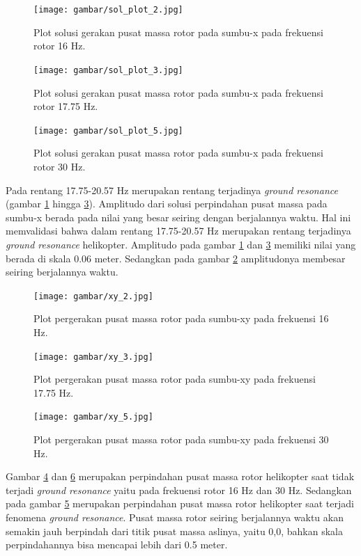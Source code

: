\begin{figure}[H]
	\centering
	\texttt{[image: gambar/sol\_plot\_2.jpg]}
	\caption{Plot solusi gerakan pusat massa rotor pada sumbu-x pada frekuensi rotor 16 Hz.}
	\label{fig:sol_plot_2}
\end{figure}

\begin{figure}[H]
	\centering
	\texttt{[image: gambar/sol\_plot\_3.jpg]}
	\caption{Plot solusi gerakan pusat massa rotor pada sumbu-x pada frekuensi rotor 17.75 Hz.}
	\label{fig:sol_plot_3}
\end{figure}

\begin{figure}[H]
	\centering
	\texttt{[image: gambar/sol\_plot\_5.jpg]}
	\caption{Plot solusi gerakan pusat massa rotor pada sumbu-x pada frekuensi rotor 30 Hz.}
	\label{fig:sol_plot_5}
\end{figure}

Pada rentang 17.75-20.57 Hz merupakan rentang terjadinya \textit{ground resonance} (gambar \ref{fig:sol_plot_2} hingga \ref{fig:sol_plot_5}). Amplitudo dari solusi perpindahan pusat massa pada sumbu-x berada pada nilai yang besar seiring dengan berjalannya waktu. Hal ini memvalidasi bahwa dalam rentang 17.75-20.57 Hz merupakan rentang terjadinya \textit{ground resonance} helikopter. Amplitudo pada gambar \ref{fig:sol_plot_2} dan \ref{fig:sol_plot_5} memiliki nilai yang berada di skala 0.06 meter. Sedangkan pada gambar \ref{fig:sol_plot_3} amplitudonya membesar seiring berjalannya waktu. 

\begin{figure}[H]
	\centering
	\texttt{[image: gambar/xy\_2.jpg]}
	\caption{Plot pergerakan pusat massa rotor pada sumbu-xy pada frekuensi 16 Hz.}
	\label{fig:xy_2}
\end{figure}

\begin{figure}[H]
	\centering
	\texttt{[image: gambar/xy\_3.jpg]}
	\caption{Plot pergerakan pusat massa rotor pada sumbu-xy pada frekuensi 17.75 Hz.}
	\label{fig:xy_3}
\end{figure}

\begin{figure}[H]
	\centering
	\texttt{[image: gambar/xy\_5.jpg]}
	\caption{Plot pergerakan pusat massa rotor pada sumbu-xy pada frekuensi 30 Hz.}
	\label{fig:xy_5}
\end{figure}

Gambar \ref{fig:xy_2} dan \ref{fig:xy_5} merupakan perpindahan pusat massa rotor helikopter saat tidak terjadi \textit{ground resonance} yaitu pada frekuensi rotor 16 Hz dan 30 Hz. Sedangkan pada gambar \ref{fig:xy_3} merupakan perpindahan pusat massa rotor helikopter saat terjadi fenomena \textit{ground resonance}. Pusat massa rotor seiring berjalannya waktu akan semakin jauh berpindah dari titik pusat massa aslinya, yaitu 0,0, bahkan skala perpindahannya bisa mencapai lebih dari 0.5 meter. 

